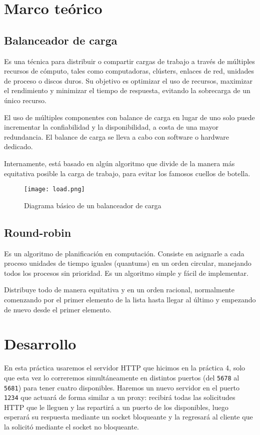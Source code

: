 \documentclass[15pt]{article}
\begin{document}
	\maketitle
	
	\section{Marco teórico}
		\subsection{Balanceador de carga}
		Es una técnica para distribuir o compartir cargas de trabajo a través de múltiples recursos de cómputo, tales como computadoras, clústers, enlaces de red, unidades de proceso o discos duros. Su objetivo es optimizar el uso de recursos, maximizar el rendimiento y minimizar el tiempo de respuesta, evitando la sobrecarga de un único recurso.
		
		El uso de múltiples componentes con balance de carga en lugar de uno solo puede incrementar la confiabilidad y la disponibilidad, a costa de una mayor redundancia. El balance de carga se lleva a cabo con software o hardware dedicado.
		
		Internamente, está basado en algún algoritmo que divide de la manera más equitativa posible la carga de trabajo, para evitar los famosos cuellos de botella.
		
		\begin{figure}[H]
			\centering
			\texttt{[image: load.png]}
			\caption{Diagrama básico de un balanceador de carga}
		\end{figure}
	
		\subsection{Round-robin}
		Es un algoritmo de planificación en computación. Consiste en asignarle a cada proceso unidades de tiempo iguales (quantums) en un orden circular, manejando todos los procesos sin prioridad. Es un algoritmo simple y fácil de implementar.
		
		Distribuye todo de manera equitativa y en un orden racional, normalmente comenzando por el primer elemento de la lista hasta llegar al último y empezando de nuevo desde el primer elemento.
	
	\section{Desarrollo}
		En esta práctica usaremos el servidor HTTP que hicimos en la práctica 4, solo que esta vez lo correremos simultáneamente en distintos puertos (del \texttt{5678} al \texttt{5681}) para tener cuatro disponibles. Haremos un nuevo servidor en el puerto \texttt{1234} que actuará de forma similar a un proxy: recibirá todas las solicitudes HTTP que le lleguen y las repartirá a un puerto de los disponibles, luego esperará su respuesta mediante un socket bloqueante y la regresará al cliente que la solicitó mediante el socket no bloqueante.
		
\end{document}
